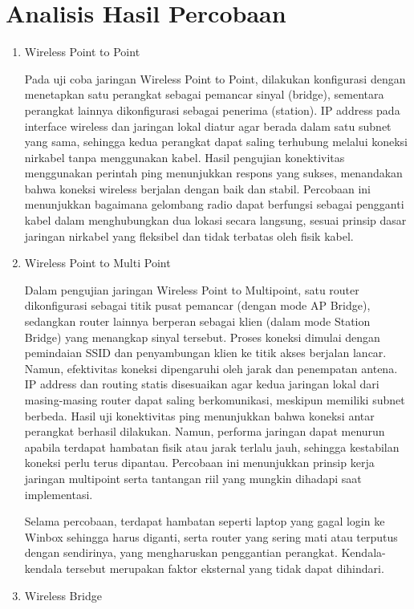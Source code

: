 \section{Analisis Hasil Percobaan}
\begin{enumerate}
    \item Wireless Point to Point
    
    Pada uji coba jaringan Wireless Point to Point, dilakukan konfigurasi dengan menetapkan satu perangkat sebagai pemancar sinyal (bridge), sementara perangkat lainnya dikonfigurasi sebagai penerima (station). IP address pada interface wireless dan jaringan lokal diatur agar berada dalam satu subnet yang sama, sehingga kedua perangkat dapat saling terhubung melalui koneksi nirkabel tanpa menggunakan kabel. Hasil pengujian konektivitas menggunakan perintah ping menunjukkan respons yang sukses, menandakan bahwa koneksi wireless berjalan dengan baik dan stabil. Percobaan ini menunjukkan bagaimana gelombang radio dapat berfungsi sebagai pengganti kabel dalam menghubungkan dua lokasi secara langsung, sesuai prinsip dasar jaringan nirkabel yang fleksibel dan tidak terbatas oleh fisik kabel.
    \item Wireless Point to Multi Point
    
    Dalam pengujian jaringan Wireless Point to Multipoint, satu router dikonfigurasi sebagai titik pusat pemancar (dengan mode AP Bridge), sedangkan router lainnya berperan sebagai klien (dalam mode Station Bridge) yang menangkap sinyal tersebut. Proses koneksi dimulai dengan pemindaian SSID dan penyambungan klien ke titik akses berjalan lancar. Namun, efektivitas koneksi dipengaruhi oleh jarak dan penempatan antena. IP address dan routing statis disesuaikan agar kedua jaringan lokal dari masing-masing router dapat saling berkomunikasi, meskipun memiliki subnet berbeda. Hasil uji konektivitas ping menunjukkan bahwa koneksi antar perangkat berhasil dilakukan. Namun, performa jaringan dapat menurun apabila terdapat hambatan fisik atau jarak terlalu jauh, sehingga kestabilan koneksi perlu terus dipantau. Percobaan ini menunjukkan prinsip kerja jaringan multipoint serta tantangan riil yang mungkin dihadapi saat implementasi.

    Selama percobaan, terdapat hambatan seperti laptop yang gagal login ke Winbox sehingga harus diganti, serta router yang sering mati atau terputus dengan sendirinya, yang mengharuskan penggantian perangkat. Kendala-kendala tersebut merupakan faktor eksternal yang tidak dapat dihindari.
    \item Wireless Bridge
    

\end{enumerate}
